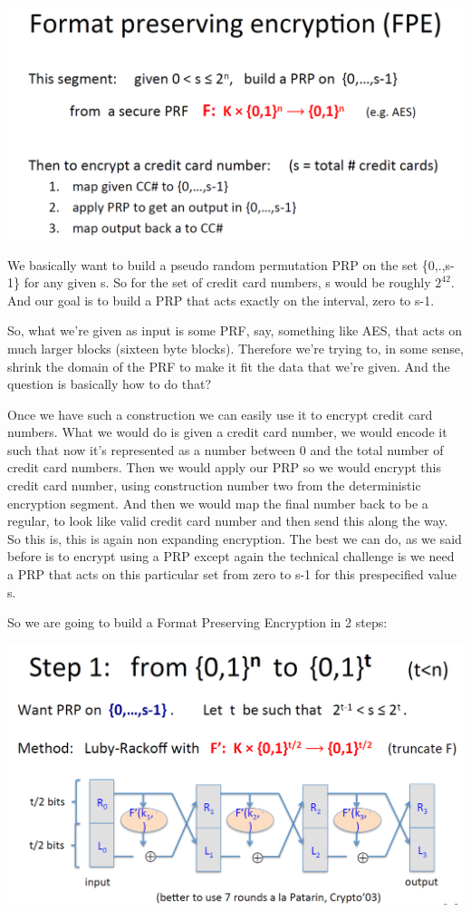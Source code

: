 \documentclass[11pt]{article}
\makeatletter
\def\maxwidth{\ifdim\Gin@nat@width>\linewidth\linewidth
    \else\Gin@nat@width\fi}
\let\Oldincludegraphics\includegraphics
\renewcommand{\includegraphics}[1]{\Oldincludegraphics[width=.8\maxwidth]{#1}}
\makeatother
\begin{document}
\includegraphics{./Images/FPE.png}

We basically want to build a pseudo random permutation PRP on the set
\{0,.,s-1\} for any given s. So for the set of credit card numbers, s
would be roughly \(2^{42}\). And our goal is to build a PRP that acts
exactly on the interval, zero to s-1.

So, what we're given as input is some PRF, say, something like AES, that
acts on much larger blocks (sixteen byte blocks). Therefore we're trying
to, in some sense, shrink the domain of the PRF to make it fit the data
that we're given. And the question is basically how to do that?

Once we have such a construction we can easily use it to encrypt credit
card numbers. What we would do is given a credit card number, we would
encode it such that now it's represented as a number between 0 and the
total number of credit card numbers. Then we would apply our PRP so we
would encrypt this credit card number, using construction number two
from the deterministic encryption segment. And then we would map the
final number back to be a regular, to look like valid credit card number
and then send this along the way. So this is, this is again non
expanding encryption. The best we can do, as we said before is to
encrypt using a PRP except again the technical challenge is we need a
PRP that acts on this particular set from zero to s-1 for this
prespecified value s.

So we are going to build a Format Preserving Encryption in 2 steps:

\includegraphics{./Images/ShrinkThePRP.png}
\end{document}
